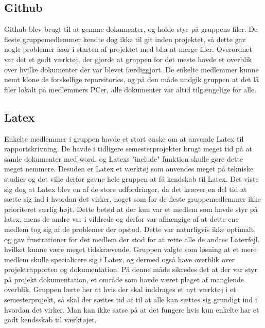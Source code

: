 \subsection{Github}
Github blev brugt til at gemme dokumenter, og holde styr på gruppens filer. De fleste gruppemedlemmer kendte dog ikke til git inden projektet, 
så dette gav nogle problemer især i starten af projektet med bl.a at merge filer. Overordnet var det et godt værktøj, der gjorde at gruppen for det meste havde
et overblik over hvilke dokumenter der var blevet færdiggjort. De enkelte medlemmer kunne nemt klone de forskellige reporsitories, og på den måde undgik gruppen
at det lå filer lokalt på medlemmers PCer, alle dokumenter var altid tilgængelige for alle.  

\subsection{Latex}
Enkelte medlemmer i gruppen havde et stort ønske om at anvende Latex til rapportskrivning. De havde i tidligere semesterprojekter brugt meget tid på at
samle dokumenter med word, og Latexs "include" funktion skulle gøre dette meget nemmere. Desuden er Latex et værktøj som anvendes meget på tekniske studier
og det ville derfor gavne hele gruppen at få kendskab til Latex. Det viste sig dog at Latex blev en af de store udfordringer, da det kræver en del
tid at sætte sig ind i hvordan det virker, noget som for de fleste gruppemedlemmer ikke prioriteret særlig højt. Dette betød at der kun var et medlem som havde 
styr på latex, mens de andre var i vildrede og derfor var afhængige af at dette ene medlem tog sig af de problemer der opstod. Dette var naturligvis ikke 
optimalt, og gav frustrationer for det medlem der stod for at rette alle de andres Latexfejl, hvilket kunne være meget tidskrævende. Gruppen valgte som løsning 
at et mere medlem skulle specialicere sig i Latex, og dermed også have overblik over projektrapporten og dokumentation. På denne måde sikredes det at der var 
styr på projekt dokumentation, et område som havde været plaget af manglende overblik. Gruppen lærte her at hvis der skal inddrages et nyt værktøj i et 
semesterprojekt, så skal der sættes tid af til at alle kan sættes sig grundigt ind i hvordan det virker. Man kan ikke satse på at det fungere hvis kun enkelte 
har et godt kendsskab til værktøjet. 

